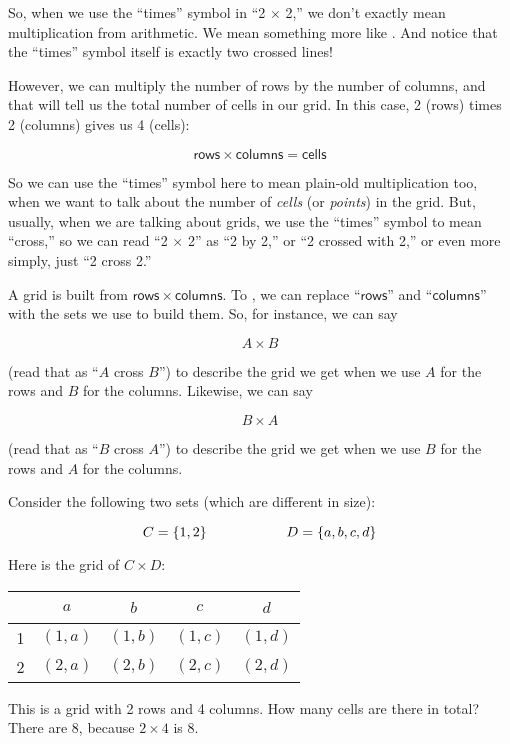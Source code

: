 \documentclass[../../../main.tex]{subfiles}
\begin{document}
So, when we use the ``times'' symbol in ``2 $\times$ 2,'' we don't exactly mean multiplication from arithmetic. We mean something more like . And notice that the ``times'' symbol itself is exactly two crossed lines!

However, we can multiply the number of rows by the number of columns, and that will tell us the total number of cells in our grid. In this case, 2 (rows) times 2 (columns) gives us 4 (cells):

\begin{equation*}
  \mathsf{rows} \times \mathsf{columns} = \mathsf{cells}
\end{equation*}

So we can use the ``times'' symbol here to mean plain-old multiplication too, when we want to talk about the number of \emph{cells} (or \emph{points}) in the grid. But, usually, when we are talking about grids, we use the ``times'' symbol to mean ``cross,'' so we can read ``2 $\times$ 2'' as ``2 by 2,'' or ``2 crossed with 2,'' or even more simply, just ``2 cross 2.''

A grid is built from $\mathsf{rows} \times \mathsf{columns}$. To , we can replace ``$\mathsf{rows}$'' and ``$\mathsf{columns}$'' with the sets we use to build them. So, for instance, we can say

\begin{equation*}
  A \times B
\end{equation*}

(read that as ``$A$ cross $B$'') to describe the grid we get when we use $A$ for the rows and $B$ for the columns. Likewise, we can say

\begin{equation*}
  B \times A
\end{equation*}

(read that as ``$B$ cross $A$'') to describe the grid we get when we use $B$ for the rows and $A$ for the columns.

\begin{fexample}

Consider the following two sets (which are different in size):

\begin{equation*}
  C = \{ 1, 2 \} \hskip 2cm D = \{ a, b, c, d \}
\end{equation*} 

Here is the grid of $C \times D$:

\begin{center}
  \begin{tabular}{| c | c | c | c | c |}
    \hline
    ~ & $a$ & $b$ & $c$ & $d$ \\
    \hline
    1 & $(1, a)$ & $(1, b)$ & $(1, c)$ & $(1, d)$ \\
    \hline
    2 & $(2, a)$ & $(2, b)$ & $(2, c)$ & $(2, d)$ \\
    \hline
  \end{tabular}
\end{center}

This is a grid with 2 rows and 4 columns. How many cells are there in total? There are 8, because $2 \times 4$ is $8$.

\end{fexample}
\end{document}
